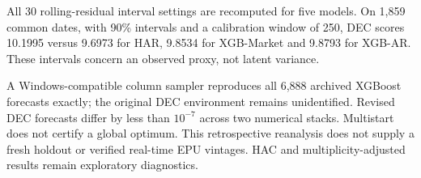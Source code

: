 All 30 rolling-residual interval settings are recomputed for five models. On 1,859 common dates, with 90\% intervals and a calibration window of 250, DEC scores 10.1995 versus 9.6973 for HAR, 9.8534 for XGB-Market and 9.8793 for XGB-AR. These intervals concern an observed proxy, not latent variance.

A Windows-compatible column sampler reproduces all 6,888 archived XGBoost forecasts exactly; the original DEC environment remains unidentified. Revised DEC forecasts differ by less than $10^{-7}$ across two numerical stacks. Multistart does not certify a global optimum. This retrospective reanalysis does not supply a fresh holdout or verified real-time EPU vintages. HAC and multiplicity-adjusted results remain exploratory diagnostics.
\clearpage
